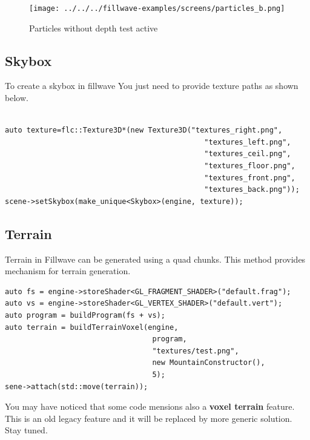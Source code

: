 \documentclass{article}
\begin{document}
\begin{figure}
    \centering
    \texttt{[image: ../../../fillwave-examples/screens/particles\_b.png]}
    \caption{Particles without depth test active}
    \label{particle_no_depth_test}
\end{figure}

\newpage

\subsection{Skybox}\label{sec:Skybox}

\indent \indent To create a skybox in fillwave You just need to provide texture paths as shown below.

\begin{lstlisting}

auto texture=flc::Texture3D*(new Texture3D("textures_right.png",
                                              "textures_left.png",
                                              "textures_ceil.png",
                                              "textures_floor.png",
                                              "textures_front.png",
                                              "textures_back.png"));
scene->setSkybox(make_unique<Skybox>(engine, texture));
\end{lstlisting}

\subsection{Terrain}\label{sec:Terrain}
\indent \indent Terrain in Fillwave can be generated using a quad chunks. This method provides mechanism for terrain generation.


\begin{lstlisting}
auto fs = engine->storeShader<GL_FRAGMENT_SHADER>("default.frag");
auto vs = engine->storeShader<GL_VERTEX_SHADER>("default.vert");
auto program = buildProgram(fs + vs);
auto terrain = buildTerrainVoxel(engine,
                                  program,
                                  "textures/test.png",
                                  new MountainConstructor(),
                                  5);
sene->attach(std::move(terrain));
\end{lstlisting}

\indent You may have noticed that some code mensions also a \textbf{voxel terrain} feature. This is an old legacy feature and it will be replaced by more generic solution. Stay tuned.
\end{document}
